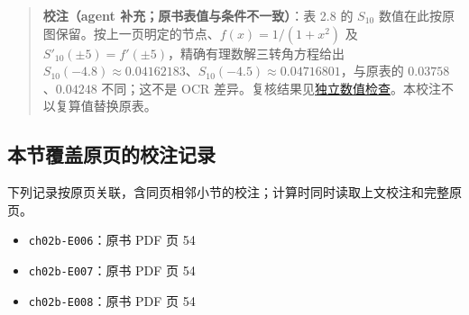 \documentclass[
  10pt,
  fontset=fandol]{ctexart}
\providecommand{\tightlist}{%
  \setlength{\itemsep}{0pt}\setlength{\parskip}{0pt}}
\begin{document}
\begin{quote}
\textbf{校注（agent 补充；原书表值与条件不一致）}：表 2.8 的 \(S_{10}\) 数值在此按原图保留。按上一页明定的节点、\(f(x)=1/(1+x^2)\) 及 \(S'_{10}(\pm5)=f'(\pm5)\)，精确有理数解三转角方程给出 \(S_{10}(-4.8)\approx0.04162183\)、\(S_{10}(-4.5)\approx0.04716801\)，与原表的 \(0.03758\)、\(0.04248\) 不同；这不是 OCR 差异。复核结果见\href{../../staging/ch02b/table-2-8-check.txt}{独立数值检查}。本校注不以复算值替换原表。
\end{quote}

\subsection{本节覆盖原页的校注记录}\label{ux672cux8282ux8986ux76d6ux539fux9875ux7684ux6821ux6ce8ux8bb0ux5f55}

下列记录按原页关联，含同页相邻小节的校注；计算时同时读取上文校注和完整原页。

\begin{itemize}
\tightlist
\item
  \texttt{ch02b-E006}：原书 PDF 页 54
\item
  \texttt{ch02b-E007}：原书 PDF 页 54
\item
  \texttt{ch02b-E008}：原书 PDF 页 54
\end{itemize}
\end{document}
